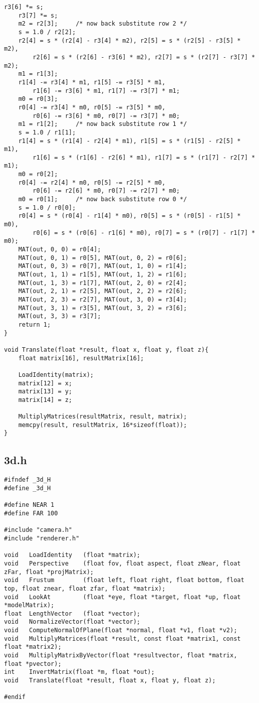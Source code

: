 \documentclass[]{article}
\begin{document}
\begin{Verbatim}[fontsize= \footnotesize, tabsize=4]
	r3[6] *= s;
	r3[7] *= s;
	m2 = r2[3];     /* now back substitute row 2 */
	s = 1.0 / r2[2];
	r2[4] = s * (r2[4] - r3[4] * m2), r2[5] = s * (r2[5] - r3[5] * m2),
		r2[6] = s * (r2[6] - r3[6] * m2), r2[7] = s * (r2[7] - r3[7] * m2);
	m1 = r1[3];
	r1[4] -= r3[4] * m1, r1[5] -= r3[5] * m1,
		r1[6] -= r3[6] * m1, r1[7] -= r3[7] * m1;
	m0 = r0[3];
	r0[4] -= r3[4] * m0, r0[5] -= r3[5] * m0,
		r0[6] -= r3[6] * m0, r0[7] -= r3[7] * m0;
	m1 = r1[2];     /* now back substitute row 1 */
	s = 1.0 / r1[1];
	r1[4] = s * (r1[4] - r2[4] * m1), r1[5] = s * (r1[5] - r2[5] * m1),
		r1[6] = s * (r1[6] - r2[6] * m1), r1[7] = s * (r1[7] - r2[7] * m1);
	m0 = r0[2];
	r0[4] -= r2[4] * m0, r0[5] -= r2[5] * m0,
		r0[6] -= r2[6] * m0, r0[7] -= r2[7] * m0;
	m0 = r0[1];     /* now back substitute row 0 */
	s = 1.0 / r0[0];
	r0[4] = s * (r0[4] - r1[4] * m0), r0[5] = s * (r0[5] - r1[5] * m0),
		r0[6] = s * (r0[6] - r1[6] * m0), r0[7] = s * (r0[7] - r1[7] * m0);
	MAT(out, 0, 0) = r0[4];
	MAT(out, 0, 1) = r0[5], MAT(out, 0, 2) = r0[6];
	MAT(out, 0, 3) = r0[7], MAT(out, 1, 0) = r1[4];
	MAT(out, 1, 1) = r1[5], MAT(out, 1, 2) = r1[6];
	MAT(out, 1, 3) = r1[7], MAT(out, 2, 0) = r2[4];
	MAT(out, 2, 1) = r2[5], MAT(out, 2, 2) = r2[6];
	MAT(out, 2, 3) = r2[7], MAT(out, 3, 0) = r3[4];
	MAT(out, 3, 1) = r3[5], MAT(out, 3, 2) = r3[6];
	MAT(out, 3, 3) = r3[7];
	return 1;
}

void Translate(float *result, float x, float y, float z){
	float matrix[16], resultMatrix[16];

	LoadIdentity(matrix);
	matrix[12] = x;
	matrix[13] = y;
	matrix[14] = z;

	MultiplyMatrices(resultMatrix, result, matrix);
	memcpy(result, resultMatrix, 16*sizeof(float));
}

\end{Verbatim}

\subsection*{3d.h}
\begin{Verbatim}[fontsize= \footnotesize, tabsize=4]
#ifndef _3d_H
#define _3d_H

#define NEAR 1
#define FAR 100

#include "camera.h"
#include "renderer.h"

void   LoadIdentity   (float *matrix);
void   Perspective    (float fov, float aspect, float zNear, float zFar, float *projMatrix);
void   Frustum        (float left, float right, float bottom, float top, float znear, float zfar, float *matrix);
void   LookAt         (float *eye, float *target, float *up, float *modelMatrix);
float  LengthVector   (float *vector);
void   NormalizeVector(float *vector);
void   ComputeNormalOfPlane(float *normal, float *v1, float *v2);
void   MultiplyMatrices(float *result, const float *matrix1, const float *matrix2);
void   MultiplyMatrixByVector(float *resultvector, float *matrix, float *pvector);
int    InvertMatrix(float *m, float *out);
void   Translate(float *result, float x, float y, float z);

#endif
\end{Verbatim}
\end{document}
